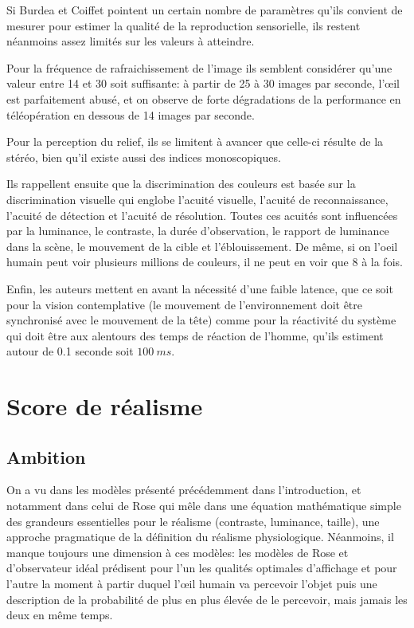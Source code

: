 	\par Si Burdea et Coiffet pointent un certain nombre de paramètres qu'ils convient de mesurer pour estimer la qualité de la reproduction sensorielle, ils restent néanmoins assez limités sur les valeurs à atteindre.
	
	\par Pour la fréquence de rafraichissement de l'image ils semblent considérer qu'une valeur entre 14 et 30 soit suffisante: à partir de 25 à 30 images par seconde, l'œil est parfaitement abusé, et on observe de forte dégradations de la performance en téléopération en dessous de 14 images par seconde.
	
	\par Pour la perception du relief, ils se limitent à avancer que celle-ci résulte de la stéréo, bien qu'il existe aussi des indices monoscopiques.
	
	\par Ils rappellent ensuite que la discrimination des couleurs est basée sur la discrimination visuelle qui englobe l'acuité visuelle, l'acuité de reconnaissance, l'acuité de détection et l'acuité de résolution. Toutes ces acuités sont influencées par la luminance, le contraste, la durée d'observation, le rapport de luminance dans la scène, le mouvement de la cible et l'éblouissement. De même, si on l'oeil humain peut voir plusieurs millions de couleurs, il ne peut en voir que 8 à la fois.
	
	\par Enfin, les auteurs mettent en avant la nécessité d'une faible latence, que ce soit pour la vision contemplative (le mouvement de l'environnement doit être synchronisé avec le mouvement de la tête) comme pour la réactivité du système qui doit être aux alentours des temps de réaction de l'homme, qu'ils estiment autour de 0.1 seconde soit $100~ms$.
	
	\chapter{Score de réalisme}
	\section{Ambition}	
	\par On a vu dans les modèles présenté précédemment dans l'introduction, et notamment dans celui de Rose qui mêle dans une équation mathématique simple des grandeurs essentielles pour le réalisme (contraste, luminance, taille), une approche pragmatique de la définition du réalisme physiologique. Néanmoins, il manque toujours une dimension à ces modèles: les modèles de Rose et d'observateur idéal prédisent pour l'un les qualités optimales d'affichage et pour l'autre la moment à partir duquel l'œil humain va percevoir l'objet puis une description de la probabilité de plus en plus élevée de le percevoir, mais jamais les deux en même temps.
	
